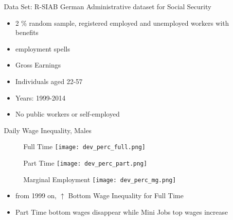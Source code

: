 \documentclass{beamer}
\begin{document}
\begin{frame}{Data Set: R-SIAB}
German Administrative dataset for Social Security\\
\vfill
\begin{itemize}
\vfill
\item 2 \% random sample, registered employed and unemployed workers with benefits
\vfill
\item employment spells
\vfill
\item Gross Earnings
\vfill
\item Individuals aged 22-57
\vfill
\item Years: 1999-2014
\vfill
\item No public workers or self-employed
\end{itemize}
\vfill
{}
\end{frame}

\begin{frame}{Daily Wage Inequality, Males}
\begin{figure}[!t]
\centering
\begin{minipage}[b]{0.32\textwidth}{Full Time}
\centering
\texttt{[image: dev\_perc\_full.png]}
\end{minipage}
\begin{minipage}[b]{0.32\textwidth}{Part Time}
\centering
\texttt{[image: dev\_perc\_part.png]}
\end{minipage}
\begin{minipage}[b]{0.32\textwidth}{Marginal Employment}
\centering
\texttt{[image: dev\_perc\_mg.png]}
\end{minipage}
\end{figure}
\begin{itemize}
\setlength{\itemsep}{0.7 cm}
\item from 1999 on, $\uparrow$ Bottom Wage Inequality for Full Time
\item  Part Time bottom wages disappear while Mini Jobs top wages increase
\end{itemize}
\end{frame}
\end{document}
